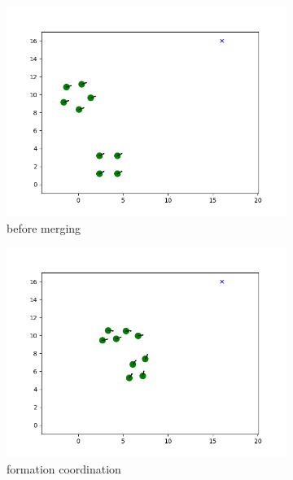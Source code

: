 \begin{figure}[htbp] 
     \centering
     \begin{subfigure}[b]{0.3\textwidth}
         \centering
         \includegraphics[width=\textwidth]{figures/merge_1.png}
         \caption{before merging}
         \label{fig:merging_a}
     \end{subfigure}
     \hfill
     \begin{subfigure}[b]{0.3\textwidth}
         \centering
         \includegraphics[width=\textwidth]{figures/merge_2.png}
         \caption{formation coordination}
         \label{fig:merging_b}
     \end{subfigure}
     \hfill
     \begin{subfigure}[b]{0.3\textwidth}

\end{subfigure}
\end{figure}
